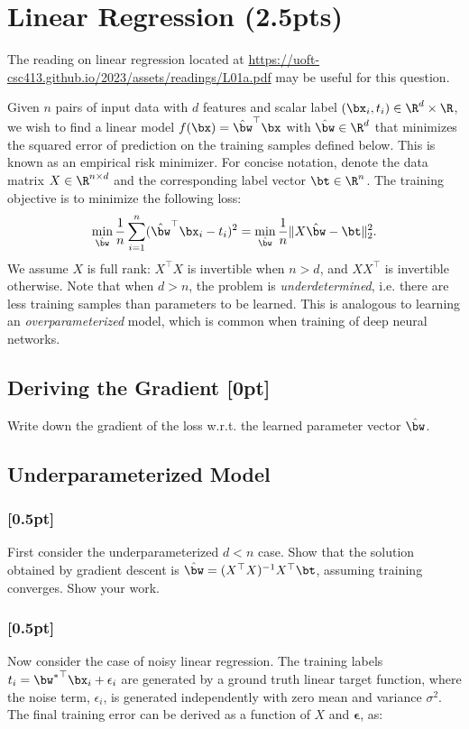 \section {Linear Regression (2.5pts)}
The reading on linear regression located at \url{https://uoft-csc413.github.io/2023/assets/readings/L01a.pdf} may be useful for this question.

Given $n$ pairs of input data with $d$ features and scalar label $(\bx_i,t_i)\in\R^{d}\times\R$, we wish to find a linear model $f(\bx) = \hat{\bw}^\top\bx$ with $\hat{\bw}\in\R^d$ that minimizes the squared error of prediction on the training samples defined below.
This is known as an empirical risk minimizer.
For concise notation, denote the data matrix $X\in\R^{n\times d}$ and the corresponding label vector $\bt\in\R^n$.
The training objective is to minimize the following loss:
\begin{align*}
    \underset{\hat{\bw}}{\mathrm{min}} \,\frac{1}{n}\sum_{i=1}^n (\hat{\bw}^\top\bx_i - t_i)^2 
=   
    \underset{\hat{\bw}}{\mathrm{min}} \,\frac{1}{n}\|X\hat{\bw} - \bt\|_2^2. 
\end{align*}
We assume $X$ is full rank: $X^\top X$ is invertible when $n>d$, and $X X^\top$ is invertible otherwise. Note that when $d>n$, the problem is \textit{underdetermined}, i.e. there are less training samples than parameters to be learned.
This is analogous to learning an \textit{overparameterized} model, which is common when training of deep neural networks.

\subsection{Deriving the Gradient {[0pt]} \LI}\label{sec:a}
Write down the gradient of the loss w.r.t. the learned parameter vector $\hat{\bw}$.

\subsection{Underparameterized Model} \label{sec:b}

\subsubsection{{\color{blue}[0.5pt]} \LI}
First consider the underparameterized $d<n$ case.
Show that the solution obtained by gradient descent is $\hat{\bw} = (X^\top X)^{-1} X^\top\bt$, assuming training converges. Show your work.

\subsubsection{{\color{blue}[0.5pt]} \LII} \label{sec:n_reg}
Now consider the case of noisy linear regression. The training labels $t_i = {\bw^*}^\top\bx_i + \epsilon_i$ are generated by a ground truth linear target function, where the noise term, $\epsilon_i$, is generated independently with zero mean and variance $\sigma^2$. The final training error can be derived as a function of $X$ and $\boldsymbol{\epsilon}$, as:

